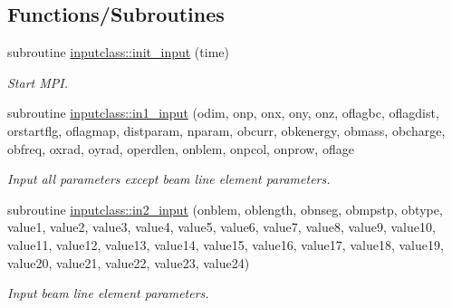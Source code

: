 \subsection*{Functions/\+Subroutines}
\begin{DoxyCompactItemize}
\item 
subroutine \mbox{\hyperlink{namespaceinputclass_ae7866a50f5576b1fea0aa1b10f98690b}{inputclass\+::init\+\_\+input}} (time)
\begin{DoxyCompactList}\small\item\em Start M\+PI. \end{DoxyCompactList}\item 
subroutine \mbox{\hyperlink{namespaceinputclass_a907319f6e5d34930fbc63f5af426e9bd}{inputclass\+::in1\+\_\+input}} (odim, onp, onx, ony, onz, oflagbc, oflagdist, orstartflg, oflagmap, distparam, nparam, obcurr, obkenergy, obmass, obcharge, obfreq, oxrad, oyrad, operdlen, onblem, onpcol, onprow, oflage
\begin{DoxyCompactList}\small\item\em Input all parameters except beam line element parameters. \end{DoxyCompactList}\item 
subroutine \mbox{\hyperlink{namespaceinputclass_af94bb0662dc4e95990a7b13c1110d831}{inputclass\+::in2\+\_\+input}} (onblem, oblength, obnseg, obmpstp, obtype, value1, value2, value3, value4, value5, value6, value7, value8, value9, value10, value11, value12, value13, value14, value15, value16, value17, value18, value19, value20, value21, value22, value23, value24)
\begin{DoxyCompactList}\small\item\em Input beam line element parameters. \end{DoxyCompactList}\end{DoxyCompactItemize}

